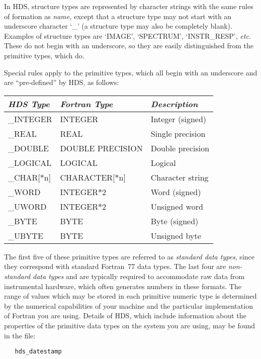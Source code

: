 In HDS, structure types are represented by character strings with the same
rules of formation as {\em name,} except that a structure type may not start
with an underscore character `\_' (a structure type may also be completely
blank). Examples of structure types are `IMAGE', `SPECTRUM', `INSTR\_RESP',
{\em etc.} These do not begin with an underscore, so they are easily
distinguished from the primitive types, which do.

Special rules apply to the primitive types, which all begin with an underscore
and are ``pre-defined'' by HDS, as follows:

\begin{center}
\begin{tabular}{|l|l|l|}
\hline
{\em HDS Type} & {\em Fortran Type\footnotemark} & {\em Description}\\
\hline \hline
\_INTEGER & INTEGER & Integer (signed)\\
\_REAL & REAL & Single precision\\
\_DOUBLE & DOUBLE PRECISION & Double precision\\
\_LOGICAL & LOGICAL & Logical\\
\_CHAR[$*$n] & CHARACTER[$*$n] & Character string\\
\hline
\_WORD & INTEGER$*$2 & Word (signed)\\
\_UWORD & INTEGER$*$2 & Unsigned word\\
\_BYTE & BYTE & Byte (signed)\\
\_UBYTE & BYTE & Unsigned byte\\
\hline
\end{tabular}
\end{center}

The first five of these primitive types are referred to as {\em standard data
types}, since they correspond with standard Fortran~77 data types. The last four
are {\em non-standard data types} and are typically required to accommodate raw
data from instrumental hardware, which often generates numbers in these formats.
The range of values which may be stored in each primitive numeric type is
determined by the numerical capabilities of your machine and the particular
implementation of Fortran you are using. Details of HDS, which include
information about the properties of the primitive data types on the system you
are using, may be found in the file:

\small
\begin{verbatim}
   hds_datestamp
\end{verbatim}
\normalsize


